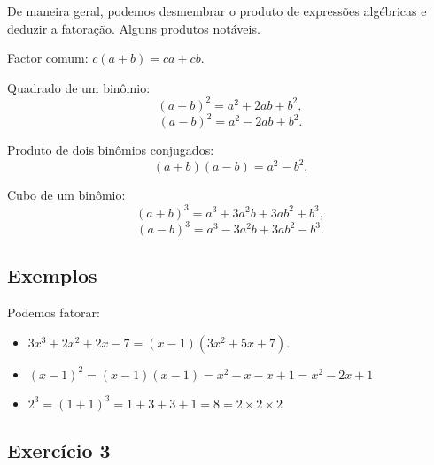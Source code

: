 De maneira geral, podemos desmembrar o produto de expressões algébricas e
deduzir a fatoração. Alguns produtos notáveis.

Factor comum: $c(a + b) = ca + cb$.

\begin{center}
\end{center}

Quadrado de um binômio:
$${(a+b)}^2 = a^2 + 2ab + b^2,$$
$${(a-b)}^2 = a^2 - 2ab + b^2.$$

\begin{center}
\end{center}

Produto de dois binômios conjugados:
$$(a + b)(a - b) = a^2 - b^2.$$

Cubo de um binômio:
$${(a+b)}^3  = a^3 + 3a^2b + 3ab^2 + b^3,$$
$${(a-b)}^3  = a^3 - 3a^2b + 3ab^2 - b^3.$$

\subsection*{Exemplos}

Podemos fatorar:
\begin{itemize}
  \item $3x^3 + 2x^2 + 2x - 7 = (x-1)(3x^2+5x+7)$.
  \item $(x-1)^2 = (x-1)(x-1) = x^2 - x - x + 1 = x^2-2x+1$
  \item $2^3 = {(1+1)}^3 = 1 + 3 + 3 + 1 = 8 = 2 \times 2 \times 2$
\end{itemize}

\subsection*{Exercício 3}

